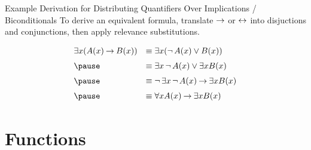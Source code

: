 \documentclass[style=sailor,size=12pt]{powerdot}
\begin{document}
\begin{wideslide}[bm=,toc=]{Example Derivation for Distributing Quantifiers Over
Implications / Biconditionals}
To derive an equivalent formula, translate $\mathbin{\rightarrow}$ or $\mathbin{\leftrightarrow}$ into disjuctions and
conjunctions, then apply relevance substitutions.
\begin{displaymath}
\def\arraystretch{1.5}
\begin{array}{ll}
\exists x (A(x) \imp B(x))  & \equiv \exists x(\ngg A(x) \lor B(x)) \\
\pause &\equiv \exists x\ngg A(x) \lor \exists x B(x) \\
\pause  &\equiv \ngg \exists x\ngg A(x) \imp \exists x B(x) \\
\pause &\equiv \forall x A(x) \imp \exists x B(x) \\

\end{array}
\end{displaymath}

\end{wideslide}

\section[slide=true]{Functions}

\end{document}
